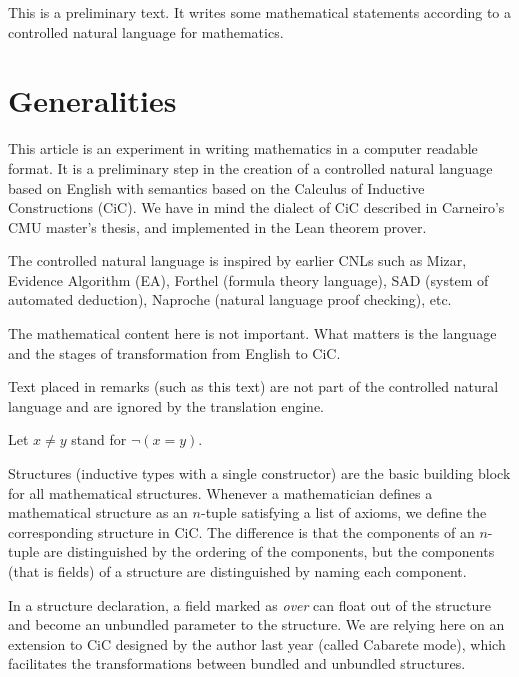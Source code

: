 \documentclass[12pt]{article}
\begin{document}
\begin{cnl}
\begin{remark}
This is a preliminary text.  It
writes some mathematical statements according to a
controlled natural language for mathematics.
\end{remark}


\section{Generalities}

\begin{remark}
This article is an experiment in writing mathematics in a computer
readable format.  It is a preliminary step in the creation of a
controlled natural language based on English with semantics based on
the Calculus of Inductive Constructions (CiC).  We have in mind the
dialect of CiC described in Carneiro's CMU master's thesis, and
implemented in the Lean theorem prover.

The controlled natural language is inspired by earlier CNLs such as
Mizar, Evidence Algorithm (EA), Forthel (formula theory language), SAD
(system of automated deduction), Naproche (natural language proof
checking), etc.

The mathematical content here is not important.  What matters is the
language and the stages of transformation from English to CiC.

Text placed in remarks (such as this text) are not part of the
controlled natural language and are ignored by the translation engine.
\end{remark}


Let $x \ne y$ stand for $\neg(x = y)$.

\begin{remark}
Structures (inductive types with a single constructor) are the basic
building block for all mathematical structures. Whenever a
mathematician defines a mathematical structure as an $n$-tuple
satisfying a list of axioms, we define the corresponding
structure in CiC. The difference is that the components of an
$n$-tuple are distinguished by the ordering of the components, but the
components (that is fields) of a structure are distinguished by naming
each component.

In a structure declaration, a field marked as {\it over} can float out
of the structure and become an unbundled parameter to the structure.
We are relying here on an extension to CiC designed by the author last
year (called Cabarete mode), which facilitates the transformations
between bundled and unbundled structures.


\end{remark}
\end{cnl}
\end{document}
